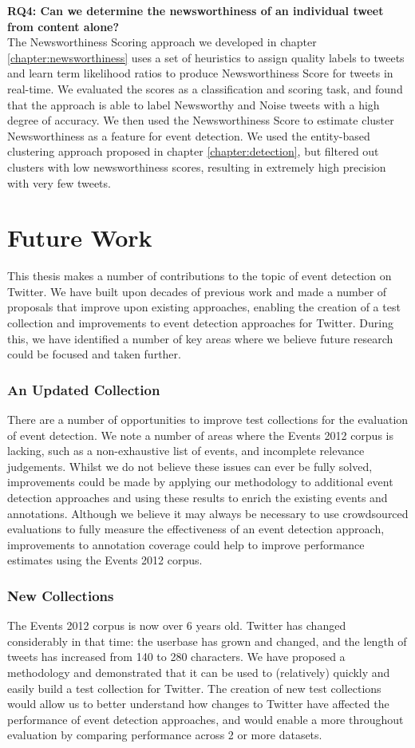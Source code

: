 \newpage
\textbf{RQ4: Can we determine the newsworthiness of an individual tweet from content alone?} \\
The Newsworthiness Scoring approach we developed in chapter \ref{chapter:newsworthiness} uses a set of heuristics to assign quality labels to tweets and learn term likelihood ratios to produce Newsworthiness Score for tweets in real-time.
We evaluated the scores as a classification and scoring task, and found that the approach is able to label Newsworthy and Noise tweets with a high degree of accuracy.
We then used the Newsworthiness Score to estimate cluster Newsworthiness as a feature for event detection.
We used the entity-based clustering approach proposed in chapter \ref{chapter:detection}, but filtered out clusters with low newsworthiness scores, resulting in extremely high precision with very few tweets.

\section{Future Work}
This thesis makes a number of contributions to the topic of event detection on Twitter.
We have built upon decades of previous work and made a number of proposals that improve upon existing approaches, enabling the creation of a test collection and improvements to event detection approaches for Twitter.
During this, we have identified a number of key areas where we believe future research could be focused and taken further.

\subsubsection{An Updated Collection} There are a number of opportunities to improve  test collections for the evaluation of event detection.
We note a number of areas where the Events 2012 corpus is lacking, such as a non-exhaustive list of events, and incomplete relevance judgements.
Whilst we do not believe these issues can ever be fully solved, improvements could be made by applying our methodology to additional event detection approaches and using these results to enrich the existing events and annotations.
Although we believe it may always be necessary to use crowdsourced evaluations to fully measure the effectiveness of an event detection approach, improvements to annotation coverage could help to improve performance estimates using the Events 2012 corpus.

\subsubsection{New Collections}
The Events 2012 corpus is now over 6 years old.
Twitter has changed considerably in that time: the userbase has grown and changed, and the length of tweets has increased from 140 to 280 characters.
We have proposed a methodology and demonstrated that it can be used to (relatively) quickly and easily build a test collection for Twitter.
The creation of new test collections would allow us to better understand how changes to Twitter have affected the performance of event detection approaches, and would enable a more throughout evaluation by comparing performance across 2 or more datasets.


